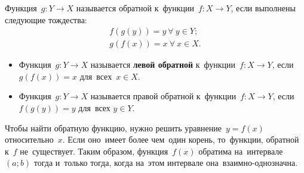 \documentclass[]{scrartcl}
\begin{document}
Функция~${\displaystyle g:Y\to X}$ называется обратной к~функции~${\displaystyle f:X\to Y}$, если выполнены следующие тождества:
\begin{equation}\label{eq:inverse-function-identity}
\begin{aligned}
f(g(y))=y\ \forall\ y \in Y;\\
g(f(x))=x\ \forall\ x \in X.
\end{aligned}
\end{equation}
\begin{itemize}
	\item Функция~${\displaystyle g:Y \to X}$ называется \textbf{левой обратной} к~функции~${\displaystyle f:X \to Y}$, если~${\displaystyle g(f(x))=x}$ для~всех~${\displaystyle x\in X}$.
	\item Функция~${\displaystyle g:Y\to X}$ называется правой обратной к~функции~${\displaystyle f:X\to Y}$, если ${\displaystyle f(g(y))=y}$ для~всех ${\displaystyle y\in Y}$.
\end{itemize}
Чтобы найти обратную функцию, нужно решить уравнение~${\displaystyle y=f(x)}$ относительно~$ {\displaystyle x}$. Если оно~имеет более чем~один корень, то~функции, обратной к~${\displaystyle f}$ не~существует. Таким образом, функция~${\displaystyle f(x)}$ обратима на~интервале~${\displaystyle (a;b)}$ тогда и~только тогда, когда на~этом интервале она~взаимно-однозначна.
\end{document}
